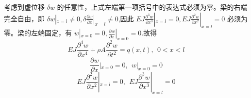 \documentclass[12pt,a4paper]{article}
\begin{document}
考虑到虚位移 $\delta w$ 的任意性，上式左端第一项括号中的表达式必须为零。梁的右端完全自由，即 $\delta w|_{x=l}\ne 0,\delta\frac{\partial w}{\partial x}|_{x=l}\ne 0$,因此 $EJ\frac{\partial^3 w}{\partial x^3}|_{x=l}=0,EJ\frac{\partial^2 w}{\partial x^2}|_{x=l}=0$ 必须为零。梁的左端固定，有 $w|_{x=0}=0,\frac{\partial w}{\partial x}|_{x=0}=0$.故得
$$
EJ\frac{\partial^4 w}{\partial x^4}+\rho A\frac{\partial^2 w}{\partial t^2}=q(x,t), ~~ 0<x<l
$$
$$
\frac{\partial w}{\partial x}|_{x=0}=0, ~~ w|_{x=0}=0
$$
$$
EJ\frac{\partial^2 w}{\partial x^2}|_{x=l}=0, ~~ EJ\frac{\partial^3 w}{\partial x^3}|_{x=l}=0 
$$






































































%

%
\end{document}
